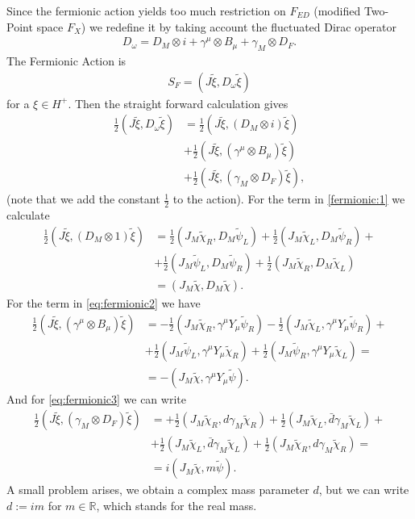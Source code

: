 Since the fermionic action yields too much restriction on $F_{ED}$ (modified
Two-Point space $F_X$) we redefine it by taking account the fluctuated Dirac
operator
\begin{align}
    D_\omega = D_M \otimes i + \gamma^\mu \otimes B_\mu + \gamma_M \otimes
    D_F.
\end{align}
The Fermionic Action is
\begin{align}
S_F = (J\tilde{\xi}, D_\omega\tilde{\xi})
\end{align}
for a $\xi \in H^+$. Then the straight forward calculation gives \begin{align}
    \frac{1}{2}(J\tilde{\xi}, D_\omega\tilde{\xi})
        &=\frac{1}{2}(J\tilde{\xi}, (D_M \otimes
        i)\tilde{\xi})\label{eq:fermionic1}\\
        &+\frac{1}{2}(J\tilde{\xi}, (\gamma^\mu \otimes B_\mu)
        \tilde{\xi})\label{eq:fermionic2}\\
        &+\frac{1}{2}(J\tilde{\xi}, (\gamma_M\otimes
        D_F)\tilde{\xi})\label{eq:fermionic3},
\end{align}
(note that we add the constant $\frac{1}{2}$ to the action).
For the term in \ref{fermionic:1} we calculate
\begin{align}
    \frac{1}{2}(J\tilde{\xi}, (D_M\otimes 1)\tilde{\xi}) &=
    \frac{1}{2}(J_M\tilde{\chi}_R,D_M\tilde{\psi}_L)+
    \frac{1}{2}(J_M\tilde{\chi}_L,D_M\tilde{\psi}_R)+
    \\&+\frac{1}{2}(J_M\tilde{\psi}_L,D_M\tilde{\psi}_R)+
    \frac{1}{2}(J_M\tilde{\chi}_R,D_M\tilde{\chi}_L)\\
    &= (J_M\tilde{\chi},D_M\tilde{\chi}).
\end{align}
For the term in \ref{eq:fermionic2} we have
\begin{align}
    \frac{1}{2}(J\tilde{\xi}, (\gamma^\mu \otimes B_\mu)\tilde{\xi})&=
    -\frac{1}{2}(J_M\tilde{\chi}_R, \gamma^\mu Y_\mu\tilde{\psi}_R)
    -\frac{1}{2}(J_M\tilde{\chi}_L, \gamma^\mu Y_\mu\tilde{\psi}_R)+\\
    &+\frac{1}{2}(J_M\tilde{\psi}_L, \gamma^\mu Y_\mu\tilde{\chi}_R)+
    \frac{1}{2}(J_M\tilde{\psi}_R, \gamma^\mu Y_\mu\tilde{\chi}_L)=\\
    &= -(J_M\tilde{\chi}, \gamma^\mu Y_\mu\tilde{\psi}).
\end{align}
And for \ref{eq:fermionic3} we can write
\begin{align}
    \frac{1}{2}(J\tilde{\xi}, (\gamma_M\otimes D_F)\tilde{\xi})&=
    +\frac{1}{2}(J_M\tilde{\chi}_R, d\gamma_M\tilde{\chi}_R)
    +\frac{1}{2}(J_M\tilde{\chi}_L, \bar{d}\gamma_M\tilde{\chi}_L)+\\
    &+\frac{1}{2}(J_M\tilde{\chi}_L, \bar{d}\gamma_M\tilde{\chi}_L)
    +\frac{1}{2}(J_M\tilde{\chi}_R, d\gamma_M\tilde{\chi}_R)=\\
    &= i(J_M\tilde{\chi}, m\tilde{\psi}).
\end{align}
A small problem arises, we obtain a complex mass parameter $d$, but we can
write $d:=im$ for $m\in \mathbb{R}$, which stands for the real mass.

